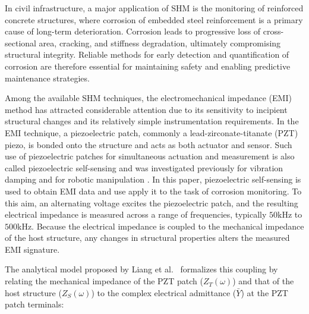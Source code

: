 \documentclass[journal,twoside,web]{ieeecolor}
\begin{document}

In civil infrastructure, a major application of SHM is the monitoring of reinforced concrete structures, where corrosion of embedded steel reinforcement is a primary cause of long-term deterioration. Corrosion leads to progressive loss of cross-sectional area, cracking, and stiffness degradation, ultimately compromising structural integrity. Reliable methods for early detection and quantification of corrosion are therefore essential for maintaining safety and enabling predictive maintenance strategies.

Among the available SHM techniques, the electromechanical impedance (EMI) method has attracted considerable attention due to its sensitivity to incipient structural changes and its relatively simple instrumentation requirements\cite{ren2025_damage_detection_shm}. In the EMI technique, a piezoelectric patch, commonly a lead-zirconate-titanate (PZT) piezo, is bonded onto the structure and acts as both actuator and sensor. Such use of piezoelectric patches for simultaneous actuation and measurement is also called piezoelectric self-sensing and was investigated previously for vibration damping and for robotic manipulation \cite{SSMech10,SSTmech15,SSTIE17,SSSNA26}. In this paper, piezoelectric self-sensing is used to obtain EMI data and use apply it to the task of corrosion monitoring. To this aim, an alternating voltage excites the piezoelectric patch, and the resulting electrical impedance is measured across a range of frequencies, typically $50$kHz to $500$kHz. Because the electrical impedance is coupled to the mechanical impedance of the host structure, any changes in structural properties alters the measured EMI signature.

The analytical model proposed by Liang et al.\ \cite{liang_1994} formalizes this coupling by relating the mechanical impedance of the PZT patch ($Z_T(\omega)$) and that of the host structure ($Z_S(\omega)$) to the complex electrical admittance ($\bar{Y}$) at the PZT patch terminals:
\end{document}
